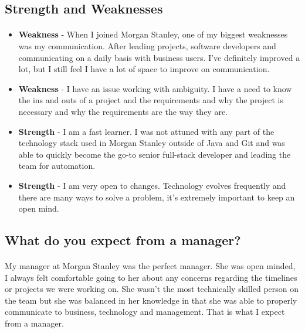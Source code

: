 \documentclass{article}
\begin{document}
\subsection{Strength and Weaknesses}

\paragraph{}

\begin{itemize}
	\item \textbf{Weakness} - When I joined Morgan Stanley, one of my biggest weaknesses was my communication. After leading projects, software developers and communicating on a daily basis with business users. I've definitely improved a lot, but I still feel I have a lot of space to improve on communication.
	\item \textbf{Weakness} - I have an issue working with ambiguity. I have a need to know the ins and outs of a project and the requirements and why the project is necessary and why the requirements are the way they are. 
	\item \textbf{Strength} - I am a fast learner. I was not attuned with any part of the technology stack used in Morgan Stanley outside of Java and Git and was able to quickly become the go-to senior full-stack developer and leading the team for automation.
	\item \textbf{Strength} - I am very open to changes. Technology evolves frequently and there are many ways to solve a problem, it's extremely important to keep an open mind.
\end{itemize}


\subsection{What do you expect from a manager?}

\paragraph{}

	My manager at Morgan Stanley was the perfect manager. She was open minded, I always felt comfortable going to her about any concerns regarding the timelines or projects we were working on. She wasn't the most technically skilled person on the team but she was balanced in her knowledge in that she was able to properly communicate to business, technology and management. That is what I expect from a manager. 
\end{document}

